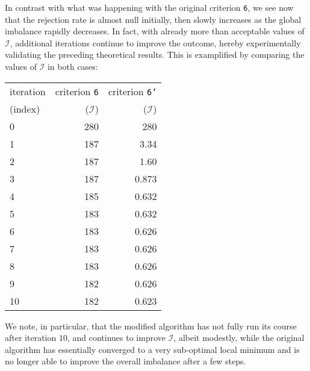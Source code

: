 In contrast with what was happening with the original criterion
\texttt{6}, we see now that the rejection rate is almost null
initially, then slowly increases as the global imbalance rapidly decreases.
In fact, with already more than acceptable values of $\mathcal{I}$,
additional iterations continue to improve the outcome, hereby
experimentally validating the preceding theoretical results. This is
examplified by comparing the values of $\mathcal{I}$ in both cases:
\begin{center}
\begin{tabular}{@{}lrr@{}}
\hline
iteration & criterion \texttt{6}  & criterion \texttt{6'} \\
(index)   & ($\mathcal{I}$) & ($\mathcal{I}$) \\
\hline\hline
 0 & 280 &   280\\
 1 & 187 &  3.34\\
 2 & 187 &  1.60\\
 3 & 187 & 0.873\\
 4 & 185 & 0.632\\
 5 & 183 & 0.632 \\
 6 & 183 & 0.626 \\
 7 & 183 & 0.626 \\
 8 & 183 & 0.626 \\
 9 & 182 & 0.626 \\
10 & 182 & 0.623 \\
\hline
\end{tabular}
\end{center}
We note, in particular, that the modified algorithm has not fully run
its course after iteration $10$, and continues to improve
$\mathcal{I}$, albeit modestly, while the original algorithm has
essentially converged to a very sub-optimal local minimum and is no
longer able to improve the overall imbalance after a few steps.